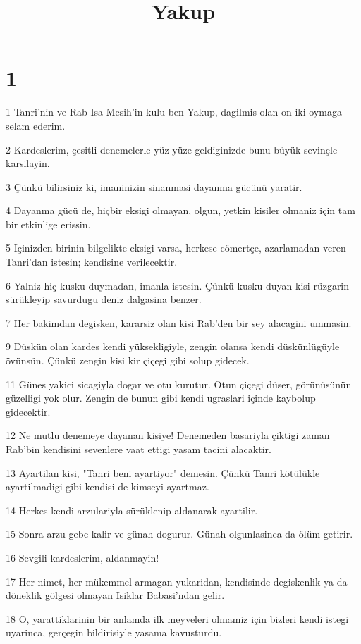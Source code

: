 

\title{Yakup}


\chapter{1}

\par 1 Tanri'nin ve Rab Isa Mesih'in kulu ben Yakup, dagilmis olan on iki oymaga selam ederim.
\par 2 Kardeslerim, çesitli denemelerle yüz yüze geldiginizde bunu büyük sevinçle karsilayin.
\par 3 Çünkü bilirsiniz ki, imaninizin sinanmasi dayanma gücünü yaratir.
\par 4 Dayanma gücü de, hiçbir eksigi olmayan, olgun, yetkin kisiler olmaniz için tam bir etkinlige erissin.
\par 5 Içinizden birinin bilgelikte eksigi varsa, herkese cömertçe, azarlamadan veren Tanri'dan istesin; kendisine verilecektir.
\par 6 Yalniz hiç kusku duymadan, imanla istesin. Çünkü kusku duyan kisi rüzgarin sürükleyip savurdugu deniz dalgasina benzer.
\par 7 Her bakimdan degisken, kararsiz olan kisi Rab'den bir sey alacagini ummasin.
\par 9 Düskün olan kardes kendi yüksekligiyle, zengin olansa kendi düskünlügüyle övünsün. Çünkü zengin kisi kir çiçegi gibi solup gidecek.
\par 11 Günes yakici sicagiyla dogar ve otu kurutur. Otun çiçegi düser, görünüsünün güzelligi yok olur. Zengin de bunun gibi kendi ugraslari içinde kaybolup gidecektir.
\par 12 Ne mutlu denemeye dayanan kisiye! Denemeden basariyla çiktigi zaman Rab'bin kendisini sevenlere vaat ettigi yasam tacini alacaktir.
\par 13 Ayartilan kisi, "Tanri beni ayartiyor" demesin. Çünkü Tanri kötülükle ayartilmadigi gibi kendisi de kimseyi ayartmaz.
\par 14 Herkes kendi arzulariyla sürüklenip aldanarak ayartilir.
\par 15 Sonra arzu gebe kalir ve günah dogurur. Günah olgunlasinca da ölüm getirir.
\par 16 Sevgili kardeslerim, aldanmayin!
\par 17 Her nimet, her mükemmel armagan yukaridan, kendisinde degiskenlik ya da döneklik gölgesi olmayan Isiklar Babasi'ndan gelir.
\par 18 O, yarattiklarinin bir anlamda ilk meyveleri olmamiz için bizleri kendi istegi uyarinca, gerçegin bildirisiyle yasama kavusturdu.
